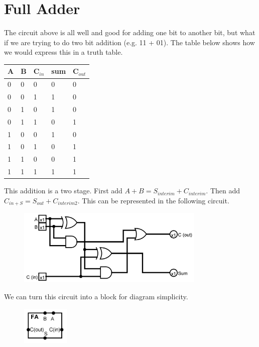 \section*{Full Adder}
The circuit above is all well and good for adding one bit to another bit, but what if we are trying to do two bit addition (e.g. 11 + 01). The table below shows how we would express this in a truth table.
\begin{table}[H]
    \centering
    \begin{tabularx}{0.4\textwidth}{XXX|XX}
        A & B & C$_{in}$ & sum & C$_{out}$\\
        \hline
        0 & 0 & 0 & 0 & 0 \\
        0 & 0 & 1 & 1 & 0 \\
        0 & 1 & 0 & 1 & 0 \\
        0 & 1 & 1 & 0 & 1 \\
        1 & 0 & 0 & 1 & 0 \\
        1 & 0 & 1 & 0 & 1 \\
        1 & 1 & 0 & 0 & 1 \\
        1 & 1 & 1 & 1 & 1 \\
    \end{tabularx}
\end{table}
This addition is a two stage. First add $A+B = S_{interim}+C_{interim}$. Then add $C_{in + S} = S_{out} + C_{interim2}$. This can be represented in the following circuit.
\begin{figure}[H]
    \centering
    \includegraphics[width=0.8\textwidth]{assets/full-adder-img.png}
\end{figure}
We can turn this circuit into a block for diagram simplicity.
\begin{figure}[H]
    \centering
    \includegraphics[width=0.2\textwidth]{assets/full-adder-block-img.png}
\end{figure}

